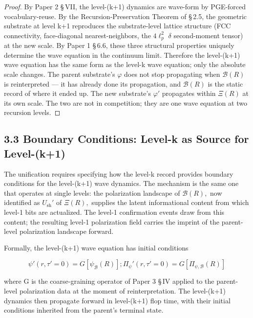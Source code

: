 \documentclass[11pt,oneside]{report}
\theoremstyle{definition}
\theoremstyle{remark}
\begin{document}
\begin{proof}
By Paper 2 \S\,VII, the level-(k+1) dynamics are wave-form by
PGE-forced vocabulary-reuse. By the Recursion-Preservation Theorem of
\S\,2.5, the geometric substrate at level k+1 reproduces the
substrate-level lattice structure (FCC connectivity, face-diagonal
nearest-neighbors, the \ensuremath{4\ell^{2}_{p}} \ensuremath{\delta} second-moment tensor) at the new scale. By
Paper 1 \S\,6.6, these three structural properties uniquely determine the
wave equation in the continuum limit. Therefore the level-(k+1) wave
equation has the same form as the level-k wave equation; only the
absolute scale changes. The parent substrate's \ensuremath{\varphi} does not stop
propagating when \ensuremath{\mathcal{B}(R)} is reinterpreted --- it has already done its
propagation, and \ensuremath{\mathcal{B}(R)} is the static record of where it ended up. The new
substrate's \ensuremath{\varphi '} propagates within \ensuremath{\Xi (R)} at its own scale. The two are not
in competition; they are one wave equation at two recursion levels.

\end{proof}

\subsection*{3.3 Boundary Conditions: Level-k as Source for Level-(k+1)}

The unification requires specifying how the level-k record provides
boundary conditions for the level-(k+1) wave dynamics. The mechanism is
the same one that operates at single levels: the polarization landscape
of \ensuremath{\mathcal{B}(R),} now identified as \ensuremath{U_{\mathrm{sh}}'} of \ensuremath{\Xi (R),} supplies the latent
informational content from which level-1 bits are actualized. The
level-1 confirmation events draw from this content; the resulting
level-1 polarization field carries the imprint of the parent-level
polarization landscape forward.

Formally, the level-(k+1) wave equation has initial conditions

\begin{equation*}
\psi '(r, \tau ' = 0) = G[\psi_{\mathcal{B}}(R)] ; \Pi_{\psi}'(r, \tau ' = 0) =
G[\Pi_{\psi,\mathcal{B}}(R)]
\end{equation*}

where G is the coarse-graining operator of Paper 3 \S\,IV applied to the
parent-level polarization data at the moment of reinterpretation. The
level-(k+1) dynamics then propagate forward in level-(k+1) flop time,
with their initial conditions inherited from the parent's terminal
state.
\end{document}
